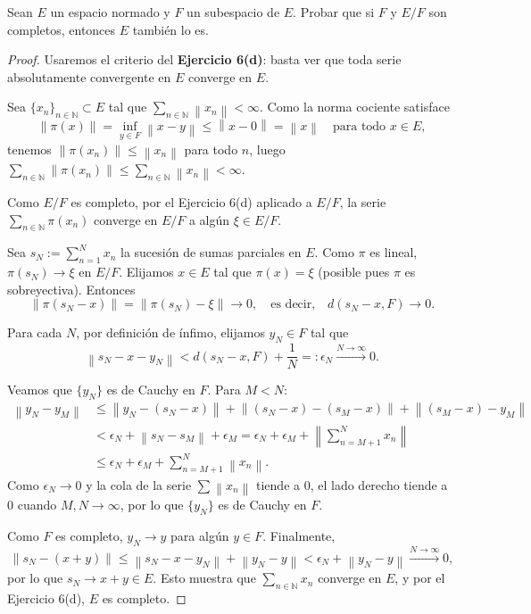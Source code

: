 \documentclass{article}
\theoremstyle{definition}
\newcommand{\N}{\mathbb{N}}
\newcommand{\norm}[1]{\left\lVert #1 \right\rVert}       %
\newenvironment{ejercicio}[1]{\begin{trivlist}
\item[\hskip \labelsep {\bfseries Ejercicio}\hskip \labelsep {\bfseries #1.}]}{\end{trivlist}}
\begin{document}
\begin{ejercicio}{12}
    Sean \(E\) un espacio normado y \(F\) un subespacio de \(E\). Probar que si \(F\) y \(E/F\) son completos, entonces \(E\) también lo es.
\end{ejercicio}
\begin{proof}
    Usaremos el criterio del \textbf{Ejercicio 6(d)}: basta ver que toda serie absolutamente convergente en \(E\) converge en \(E\).

    Sea \( {\{x_n\}}_{n\in\N} \subset E \) tal que \( \sum_{n\in\N} \norm{x_n} < \infty \). Como la norma cociente satisface
    \[
        \norm{\pi(x)} = \inf_{y\in F} \norm{x-y} \leq \norm{x-0} = \norm{x} \quad \text{para todo } x \in E,
    \]
    tenemos \( \norm{\pi(x_n)} \leq \norm{x_n} \) para todo \(n\), luego \( \sum_{n\in\N} \norm{\pi(x_n)} \leq \sum_{n\in\N} \norm{x_n} < \infty \).

    Como \(E/F\) es completo, por el Ejercicio 6(d) aplicado a \(E/F\), la serie \( \sum_{n\in\N} \pi(x_n) \) converge en \(E/F\) a algún \( \xi \in E/F \).

    Sea \( s_N := \sum_{n=1}^N x_n \) la sucesión de sumas parciales en \(E\). Como \( \pi \) es lineal, \( \pi(s_N) \to \xi \) en \(E/F\). Elijamos \( x \in E \) tal que \( \pi(x) = \xi \) (posible pues \( \pi \) es sobreyectiva). Entonces
    \[
        \norm{\pi(s_N - x)} = \norm{\pi(s_N) - \xi} \to 0, \quad \text{es decir,} \quad d(s_N - x, F) \to 0.
    \]

    Para cada \(N\), por definición de ínfimo, elijamos \( y_N \in F \) tal que
    \[
        \norm{s_N - x - y_N} < d(s_N - x, F) + \frac{1}{N} =: \epsilon_N \xrightarrow{N\to\infty} 0.
    \]

    Veamos que \( {\{y_N\}} \) es de Cauchy en \(F\). Para \( M < N \):
    \begin{align*}
        \norm{y_N - y_M} & \leq \norm{y_N - (s_N-x)} + \norm{(s_N-x)-(s_M-x)} + \norm{(s_M-x)-y_M}                            \\
                         & < \epsilon_N + \norm{s_N - s_M} + \epsilon_M = \epsilon_N + \epsilon_M + \norm{\sum_{n=M+1}^N x_n} \\
                         & \leq \epsilon_N + \epsilon_M + \sum_{n=M+1}^N \norm{x_n}.
    \end{align*}
    Como \( \epsilon_N \to 0 \) y la cola de la serie \( \sum \norm{x_n} \) tiende a \(0\), el lado derecho tiende a \(0\) cuando \( M,N \to \infty \), por lo que \( {\{y_N\}} \) es de Cauchy en \(F\).

    Como \(F\) es completo, \( y_N \to y \) para algún \( y \in F \). Finalmente,
    \[
        \norm{s_N - (x+y)} \leq \norm{s_N - x - y_N} + \norm{y_N - y} < \epsilon_N + \norm{y_N - y} \xrightarrow{N\to\infty} 0,
    \]
    por lo que \( s_N \to x+y \in E \). Esto muestra que \( \sum_{n\in\N} x_n \) converge en \(E\), y por el Ejercicio 6(d), \(E\) es completo.
\end{proof}
\end{document}
